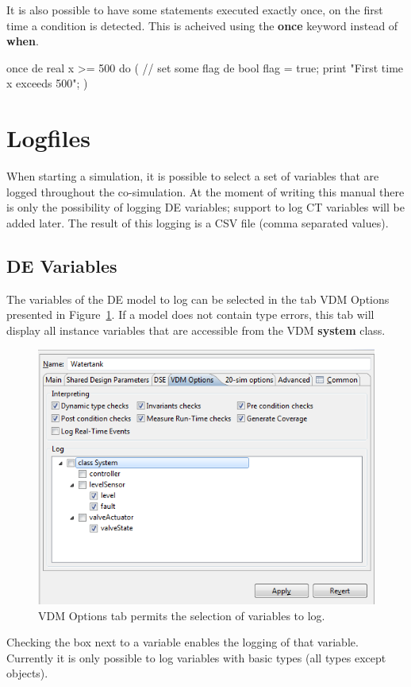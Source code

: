 \documentclass{crescendorepchap}
\newcommand{\vdmkeyw}[1]{{\bf\ttfamily #1}}
\begin{document}
It is also possible to have some statements executed exactly once, on
the first time a condition is detected. This is acheived using the
\vdmkeyw{once} keyword instead of \vdmkeyw{when}.

\begin{dcl}
once de real x >= 500 do
(
// set some flag
de bool flag = true;
print "First time x exceeds 500";
)
\end{dcl}

\section{Logfiles}\label{sec:Logfiles}

When starting a simulation, it is possible to select a set of variables
that are logged throughout the co-simulation. At the moment of writing this manual
there is only the possibility of logging DE variables;
support to log CT variables will be added later. The result of this
logging is a CSV file (comma separated values).

\subsection{DE Variables}

The variables of the DE model to log can be selected in the tab VDM
Options presented in Figure~\ref{fig:logvariables}. If a model does not contain type
errors, this tab will display all instance variables that are accessible
from the VDM \vdmkeyw{system} class.

\begin{figure}[hb]
\centering
\includegraphics[width=.6\textwidth]{images/Destecsloggingvariables.PNG}
\caption{VDM Options tab permits the selection of variables to log.}
\label{fig:logvariables}
\end{figure}

Checking the box next to a variable enables the logging of that
variable. Currently it is only possible to log variables with basic
types (all types except objects).
\end{document}
